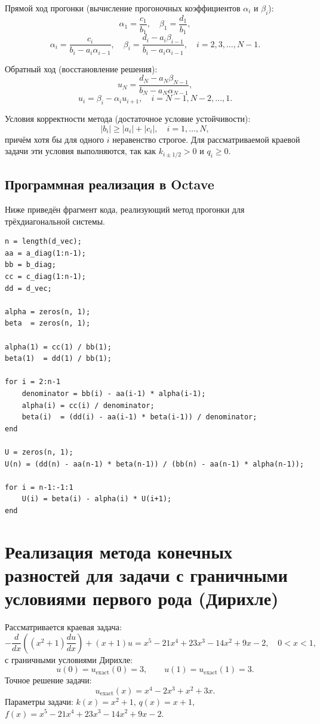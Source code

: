 \documentclass[14pt,a4paper]{extarticle}  %
\numberwithin{equation}{section}
\begin{document}
Прямой ход прогонки (вычисление прогоночных коэффициентов \(\alpha_i\) и \(\beta_i\)):
\[
\alpha_1 = \frac{c_1}{b_1}, \quad \beta_1 = \frac{d_1}{b_1},
\]
\[
\alpha_i = \frac{c_i}{b_i - a_i \alpha_{i-1}}, \quad
\beta_i = \frac{d_i - a_i \beta_{i-1}}{b_i - a_i \alpha_{i-1}}, \quad i = 2, 3, \dots, N-1.
\]

Обратный ход (восстановление решения):
\[
u_N = \frac{d_N - a_N \beta_{N-1}}{b_N - a_N \alpha_{N-1}},
\]
\[
u_i = \beta_i - \alpha_i u_{i+1}, \quad i = N-1, N-2, \dots, 1.
\]

Условия корректности метода (достаточное условие устойчивости):
\[
|b_i| \ge |a_i| + |c_i|, \quad i = 1, \dots, N,
\]
причём хотя бы для одного \(i\) неравенство строгое. 
Для рассматриваемой краевой задачи эти условия выполняются, 
так как \(k_{i\pm1/2} > 0\) и \(q_i \ge 0\).

\subsection{Программная реализация в Octave}

Ниже приведён фрагмент кода, реализующий метод прогонки для 
трёхдиагональной системы.

\begin{verbatim}
n = length(d_vec);
aa = a_diag(1:n-1);
bb = b_diag;
cc = c_diag(1:n-1);
dd = d_vec;

alpha = zeros(n, 1);
beta  = zeros(n, 1);

alpha(1) = cc(1) / bb(1);
beta(1)  = dd(1) / bb(1);

for i = 2:n-1
    denominator = bb(i) - aa(i-1) * alpha(i-1);
    alpha(i) = cc(i) / denominator;
    beta(i)  = (dd(i) - aa(i-1) * beta(i-1)) / denominator;
end

U = zeros(n, 1);
U(n) = (dd(n) - aa(n-1) * beta(n-1)) / (bb(n) - aa(n-1) * alpha(n-1));

for i = n-1:-1:1
    U(i) = beta(i) - alpha(i) * U(i+1);
end
\end{verbatim}

\newpage
\section{Реализация метода конечных разностей для задачи с граничными условиями первого рода (Дирихле)}

Рассматривается краевая задача:
\begin{equation*}
    -\frac{d}{dx}\left((x^2+1)\frac{du}{dx}\right) + (x+1)u = x^5 - 21x^4 + 23x^3 - 14x^2 + 9x - 2, \quad 0 < x < 1,
\end{equation*}
с граничными условиями Дирихле:
\begin{equation*}
    u(0) = u_{\text{exact}}(0) = 3, \qquad u(1) = u_{\text{exact}}(1) = 3.
\end{equation*}
Точное решение задачи:
\begin{equation*}
    u_{\text{exact}}(x) = x^4 - 2x^3 + x^2 + 3x.
\end{equation*}
Параметры задачи: $k(x)=x^2+1$, $q(x)=x+1$, $f(x)=x^5-21x^4+23x^3-14x^2+9x-2$.
\end{document}
